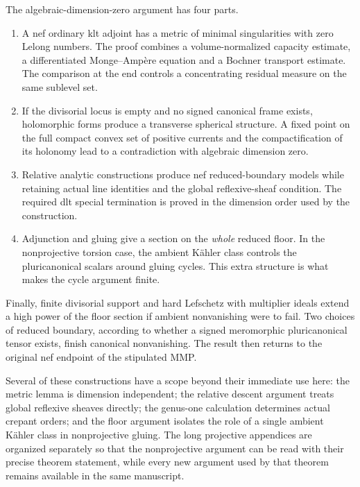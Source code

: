 \documentclass[11pt,letterpaper]{article}
\theoremstyle{definition}
\theoremstyle{remark}
\begin{document}
The algebraic-dimension-zero argument has four parts.
\begin{enumerate}
\item A nef ordinary klt adjoint has a metric of minimal
singularities with zero Lelong numbers. The proof combines a
volume-normalized capacity estimate, a differentiated
Monge--Amp\`ere equation and a Bochner transport estimate. The
comparison at the end controls a concentrating residual measure
on the same sublevel set.
\item If the divisorial locus is empty and no signed canonical
frame exists, holomorphic forms produce a transverse spherical
structure. A fixed point on the full compact convex set of positive
currents and the compactification of its holonomy lead to a
contradiction with algebraic dimension zero.
\item Relative analytic constructions produce nef reduced-boundary
models while retaining actual line identities and the global
reflexive-sheaf condition. The required dlt special termination is
proved in the dimension order used by the construction.
\item Adjunction and gluing give a section on the \emph{whole}
reduced floor. In the nonprojective torsion case, the ambient
K\"ahler class controls the pluricanonical scalars around gluing
cycles. This extra structure is what makes the cycle argument
finite.
\end{enumerate}
Finally, finite divisorial support and hard Lefschetz with multiplier
ideals extend a high power of the floor section if ambient
nonvanishing were to fail. Two choices of reduced boundary, according
to whether a signed meromorphic pluricanonical tensor exists, finish
canonical nonvanishing. The result then returns to the original nef
endpoint of the stipulated MMP.

Several of these constructions have a scope beyond their immediate
use here: the metric lemma is dimension independent; the relative
descent argument treats global reflexive sheaves directly; the
genus-one calculation determines actual crepant orders; and the
floor argument isolates the role of a single ambient K\"ahler
class in nonprojective gluing. The long projective appendices are
organized separately so that the nonprojective argument can be read
with their precise theorem statement, while every new argument used
by that theorem remains available in the same manuscript.
\end{document}
